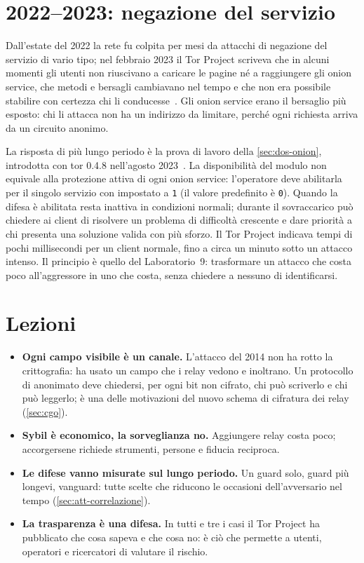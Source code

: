\section{2022--2023: negazione del servizio}\label{sec:casi-dos}

Dall'estate del 2022 la rete fu colpita per mesi da attacchi di negazione del servizio di vario tipo; nel febbraio 2023 il Tor Project scriveva che in alcuni momenti gli utenti non riuscivano a caricare le pagine né a raggiungere gli onion service, che metodi e bersagli cambiavano nel tempo e che non era possibile stabilire con certezza chi li conducesse~\cite{torblog2023dos}. Gli onion service erano il bersaglio più esposto: chi li attacca non ha un indirizzo da limitare, perché ogni richiesta arriva da un circuito anonimo.

La risposta di più lungo periodo è la prova di lavoro della \cref{sec:dos-onion}, introdotta con tor 0.4.8 nell'agosto 2023~\cite{torblog2023pow}. La disponibilità del modulo non equivale alla protezione attiva di ogni onion service: l'operatore deve abilitarla per il singolo servizio con  impostato a \texttt{1} (il valore predefinito è \texttt{0}). Quando la difesa è abilitata resta inattiva in condizioni normali; durante il sovraccarico può chiedere ai client di risolvere un problema di difficoltà crescente e dare priorità a chi presenta una soluzione valida con più sforzo. Il Tor Project indicava tempi di pochi millisecondi per un client normale, fino a circa un minuto sotto un attacco intenso. Il principio è quello del Laboratorio~9: trasformare un attacco che costa poco all'aggressore in uno che costa, senza chiedere a nessuno di identificarsi.

\section{Lezioni}\label{sec:casi-lezioni}

\begin{itemize}
  \item \textbf{Ogni campo visibile è un canale.} L'attacco del 2014 non ha rotto la crittografia: ha usato un campo che i relay vedono e inoltrano. Un protocollo di anonimato deve chiedersi, per ogni bit non cifrato, chi può scriverlo e chi può leggerlo; è una delle motivazioni del nuovo schema di cifratura dei relay (\cref{sec:cgo}).
  \item \textbf{Sybil è economico, la sorveglianza no.} Aggiungere relay costa poco; accorgersene richiede strumenti, persone e fiducia reciproca.
  \item \textbf{Le difese vanno misurate sul lungo periodo.} Un guard solo, guard più longevi, vanguard: tutte scelte che riducono le occasioni dell'avversario nel tempo (\cref{sec:att-correlazione}).
  \item \textbf{La trasparenza è una difesa.} In tutti e tre i casi il Tor Project ha pubblicato che cosa sapeva e che cosa no: è ciò che permette a utenti, operatori e ricercatori di valutare il rischio.
\end{itemize}

